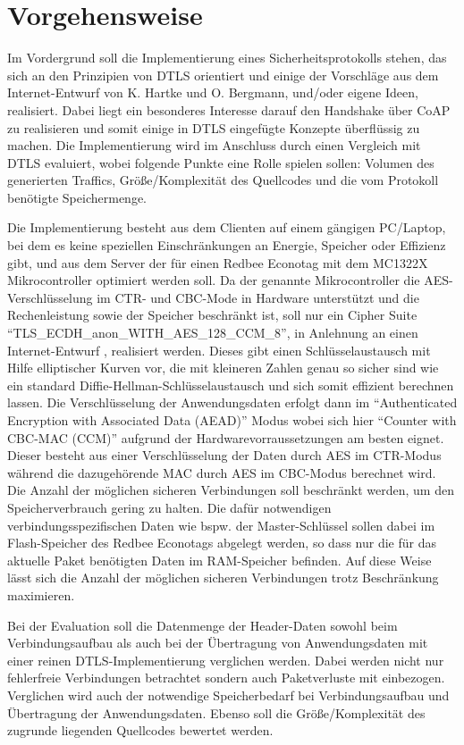 \chapter{Vorgehensweise}

Im Vordergrund soll die Implementierung eines Sicherheitsprotokolls stehen, das sich an den Prinzipien von DTLS orientiert
und einige der Vorschläge aus dem Internet-Entwurf von K. Hartke und O. Bergmann, und/oder eigene Ideen, realisiert.
Dabei liegt ein besonderes Interesse darauf den Handshake über CoAP zu realisieren und somit einige in DTLS eingefügte Konzepte überflüssig zu machen.
Die Implementierung wird im Anschluss durch einen Vergleich mit DTLS evaluiert, wobei folgende Punkte eine Rolle spielen sollen:
Volumen des generierten Traffics, Größe/Komplexität des Quellcodes und die vom Protokoll benötigte Speichermenge.

Die Implementierung besteht aus dem Clienten auf einem gängigen PC/Laptop, bei dem es keine speziellen Einschränkungen an Energie,
Speicher oder Effizienz gibt, und aus dem Server der für einen Redbee Econotag \cite{econotag} mit dem MC1322X
Mikrocontroller \cite{mc1322x} optimiert werden soll. Da der genannte Mikrocontroller die AES-Verschlüsselung im CTR- und CBC-Mode
in Hardware unterstützt und die Rechenleistung sowie der Speicher beschränkt ist, soll nur ein Cipher Suite "`TLS\_ECDH\_anon\_WITH\_AES\_128\_CCM\_8"',
in Anlehnung an einen Internet-Entwurf \cite{draftaesecc}, realisiert werden. Dieses gibt einen Schlüsselaustausch mit Hilfe elliptischer
Kurven vor, die mit kleineren Zahlen genau so sicher sind wie ein standard Diffie-Hellman-Schlüsselaustausch und sich somit effizient berechnen
lassen. Die Verschlüsselung der Anwendungsdaten erfolgt dann im "`Authenticated Encryption with Associated Data (AEAD)"' Modus \cite{rfc5116}
wobei sich hier "`Counter with CBC-MAC (CCM)"' \cite{rfc3610} aufgrund der Hardwarevorraussetzungen am besten eignet. Dieser besteht
aus einer Verschlüsselung der Daten durch AES im CTR-Modus während die dazugehörende MAC durch AES im CBC-Modus berechnet wird.
Die Anzahl der möglichen sicheren Verbindungen soll beschränkt werden, um den Speicherverbrauch gering zu halten.
Die dafür notwendigen verbindungsspezifischen Daten wie bspw. der Master-Schlüssel sollen dabei im Flash-Speicher des Redbee Econotags
abgelegt werden, so dass nur die für das aktuelle Paket benötigten Daten im RAM-Speicher befinden. Auf diese Weise lässt sich
die Anzahl der möglichen sicheren Verbindungen trotz Beschränkung maximieren.

Bei der Evaluation soll die Datenmenge der Header-Daten sowohl beim Verbindungsaufbau als auch bei der Übertragung von Anwendungsdaten
mit einer reinen DTLS-Implementierung verglichen werden. Dabei werden nicht nur fehlerfreie Verbindungen betrachtet sondern auch Paketverluste
mit einbezogen. Verglichen wird auch der notwendige Speicherbedarf bei Verbindungsaufbau und Übertragung der Anwendungsdaten.
Ebenso soll die Größe/Komplexität des zugrunde liegenden Quellcodes bewertet werden.